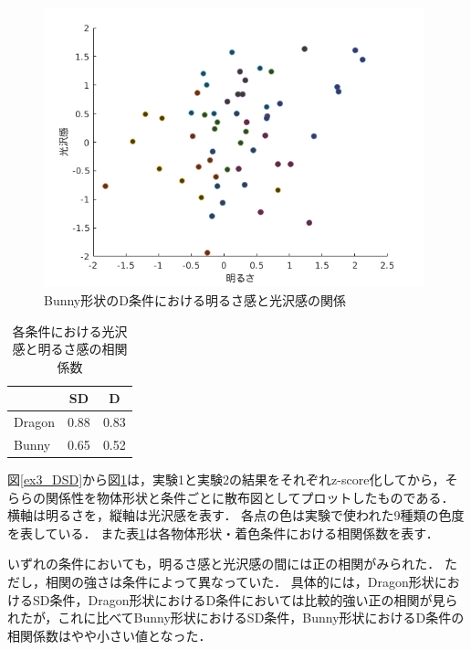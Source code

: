             \begin{figure}[h]
                \centering
                \includegraphics[width=11.0cm]{./img/ex3_BD.png}
                \caption{Bunny形状のD条件における明るさ感と光沢感の関係}
                \label{ex3_BD}
            \end{figure}

            \begin{table}[h]
                \centering
                \caption{各条件における光沢感と明るさ感の相関係数}
                \begin{tabular}{|l||c|c|} \hline
                                & SD       & D        \\ \hline \hline
                    Dragon      & 0.88   & 0.83   \\ \hline
                    Bunny       & 0.65   & 0.52   \\ \hline
                \end{tabular}
                \label{cc}
            \end{table}

            図\ref{ex3_DSD}から図\ref{ex3_BD}は，実験1と実験2の結果をそれぞれz-score化してから，そららの関係性を物体形状と条件ごとに散布図としてプロットしたものである．
            横軸は明るさを，縦軸は光沢感を表す．
            各点の色は実験で使われた9種類の色度を表している．
            また表\ref{cc}は各物体形状・着色条件における相関係数を表す．

            いずれの条件においても，明るさ感と光沢感の間には正の相関がみられた．
            ただし，相関の強さは条件によって異なっていた．
            具体的には，Dragon形状におけるSD条件，Dragon形状におけるD条件においては比較的強い正の相関が見られたが，これに比べてBunny形状におけるSD条件，Bunny形状におけるD条件の相関係数はやや小さい値となった．
            
